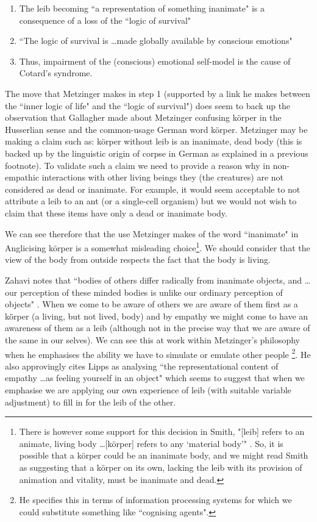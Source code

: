 \begin{enumerate}
    \item The leib becoming ``a representation of something inanimate" is a consequence of a loss of the ``logic of survival" \cite[p. 457]{metzinger2003}
    \item ``The logic of survival is \ldots made globally available by conscious emotions" \cite[p. 457]{metzinger2003}
    \item Thus, impairment of the (conscious) emotional self-model is the cause of Cotard's syndrome.
\end{enumerate}

The move that Metzinger makes in step 1 (supported by a link he makes between the ``inner logic of life" and the ``logic of survival") does seem to back up the observation that Gallagher made about Metzinger confusing k\"{o}rper in the Husserlian sense and the common-usage German word k\"{o}rper. Metzinger may be making a claim such as: k\"{o}rper without leib is an inanimate, dead body (this is backed up by the linguistic origin of corpse in German as explained in a previous footnote). To validate such a claim we need to provide a reason why in non-empathic interactions with other living beings they (the creatures) are not considered as dead or inanimate. For example, it would seem acceptable to not attribute a leib to an ant (or a single-cell organism) but we would not wish to claim that these items have only a dead or inanimate body.

We can see therefore that the use Metzinger makes of the word ``inanimate" in Anglicising k\"{o}rper is a somewhat misleading choice\footnote{There is however some support for this decision in Smith, "[leib] refers to an animate, living body \ldots [k\"{o}rper] refers to any ‘material body'" \cite[p. 220]{smith2003}. So, it is possible that a k\"{o}rper could be an inanimate body, and we might read Smith as suggesting that a k\"{o}rper on its own, lacking the leib with its provision of animation and vitality, must be inanimate and dead.}. We should consider that the view of the body from outside respects the fact that the body is living.

Zahavi notes that ``bodies of others differ radically from inanimate objects, and \ldots our perception of these minded bodies is unlike our ordinary perception of objects" \cite[p. 155]{zahavi2005}. When we come to be aware of others we are aware of them first as a k\"{ö}rper (a living, but not lived, body) and by empathy we might come to have an awareness of them as a leib (although not in the precise way that we are aware of the same in our selves). We can see this at work within Metzinger's philosophy when he emphasises the ability we have to simulate or emulate other people \cite[pp. 300-301]{zahavi2005}\footnote{He specifies this in terms of information processing systems for which we could substitute something like ``cognising agents".}. He also approvingly cites Lipps as analysing ``the representational content of empathy \ldots as feeling yourself in an object" which seems to suggest that when we emphasise we are applying our own experience of leib (with suitable variable adjustment) to fill in for the leib of the other.


